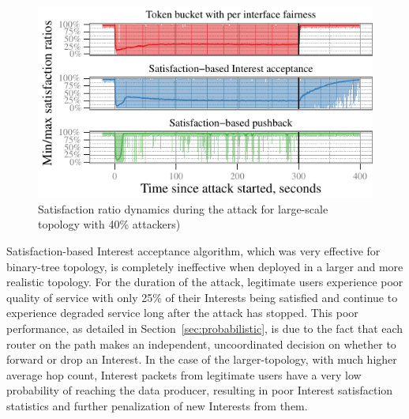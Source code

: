 \documentclass[10pt,conference]{IEEEtran}
\begin{document}
{%

\begin{figure}[t]
 \centering
 \includegraphics[scale=0.8]{paper-topo-7018-gw/7018-r0-good-0-producer-gw}
 \caption{Satisfaction ratio dynamics during the attack for large-scale topology with 40\% attackers)}
 \label{fig:large-scale}
\end{figure}

Satisfaction-based Interest acceptance algorithm, which was very effective for binary-tree topology, is completely ineffective when deployed in a larger and more realistic topology.  For the duration of the attack, legitimate users experience poor quality of service with only 25\% of their Interests being satisfied and continue to experience degraded service long after the attack has stopped. This poor performance, as detailed in Section~\ref{sec:probabilistic}, is due to the fact that each router on the path makes an independent, uncoordinated decision on whether to forward or drop an Interest. In the case of the larger-topology, with much higher average hop count, Interest packets from legitimate users have a very low probability of reaching the data producer, resulting in poor Interest satisfaction statistics and further penalization of new Interests from them.

}
\end{document}

